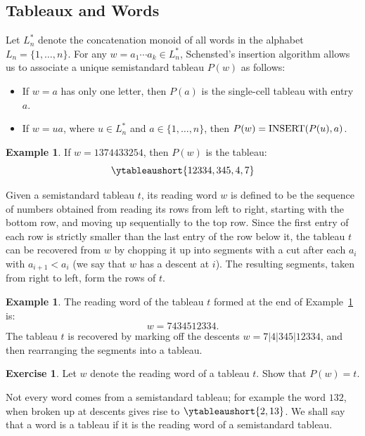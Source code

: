 \documentclass[11pt]{amsproc}
\theoremstyle{definition}
\theoremstyle{example}
\newtheorem{example}[theorem]{Example}
\newtheorem{exercise}[theorem]{Exercise}
\newcommand{\ins}{\textup{INSERT}}
\begin{document}
\subsection{Tableaux and Words}
\label{sec:tabl-assoc-word}
Let $L^*_n$ denote the concatenation monoid of all words in the alphabet $L_n=\{1,\dotsc,n\}$.
For any $w=a_1\dotsb a_k\in L^*_n$, Schensted's insertion algorithm allows us to associate a unique semistandard tableau $P(w)$ as follows:
\begin{itemize}
\item If $w=a$ has only one letter, then $P(a)$ is the single-cell tableau with entry $a$.
\item If $w=ua$, where $u\in L_n^*$ and $a\in \{1,\dotsc,n\}$, then \linebreak $P(w)=\ins(P(u), a)$.
\end{itemize}
\begin{example}
  \label{example:insertion}
  If $w=1374433254$, then $P(w)$ is the tableau:
  \begin{displaymath}
    \ytableaushort{12334,345,4,7}
  \end{displaymath}
\end{example}
\label{sec:tableau-as-words}
Given a semistandard tableau $t$, its reading word $w$ is defined to be the sequence of numbers obtained from reading its rows from left to right, starting with the bottom row, and moving up sequentially to the top row.
Since the first entry of each row is strictly smaller than the last entry of the row below it, the tableau $t$ can be recovered from $w$ by chopping it up into segments with a cut after each $a_i$ with $a_{i+1}<a_i$ (we say that $w$ has a descent at $i$). The resulting segments, taken from right to left, form the rows of $t$.
\begin{example}
  The reading word of the tableau $t$ formed at the end of Example~\ref{example:insertion} is:
  \begin{displaymath}
    w = 7434512334.
  \end{displaymath}
  The tableau $t$ is recovered by marking off the descents $w = 7|4|345|12334$, and then rearranging the segments into a tableau.
\end{example}
\begin{exercise}
  \label{exercise:tableau-word}
  Let $w$ denote the reading word of a tableau $t$.
  Show that $P(w)=t$.
\end{exercise}
Not every word comes from a semistandard tableau; for example the word $132$, when broken up at descents gives rise to $\ytableaushort{2,13}$.
We shall say that a word is a tableau if it is the reading word of a semistandard tableau.
\end{document}
